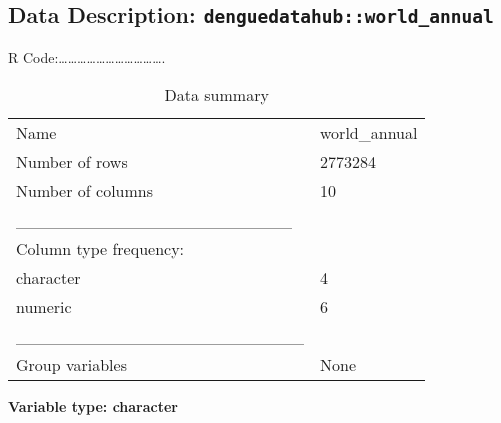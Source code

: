 \documentclass[
  letterpaper,
  DIV=11,
  numbers=noendperiod]{scrreprt}
\begin{document}
\subsection{\texorpdfstring{Data Description:
\texttt{denguedatahub::world\_annual}}{Data Description: denguedatahub::world\_annual}}\label{data-description-denguedatahubworld_annual}

R
Code:\ldots\ldots\ldots\ldots\ldots\ldots\ldots\ldots\ldots\ldots\ldots.

\begin{longtable}[]{@{}ll@{}}
\caption{Data summary}\tabularnewline
\toprule\noalign{}
\endfirsthead
\endhead
\bottomrule\noalign{}
\endlastfoot
Name & world\_annual \\
Number of rows & 2773284 \\
Number of columns & 10 \\
\_\_\_\_\_\_\_\_\_\_\_\_\_\_\_\_\_\_\_\_\_\_\_ & \\
Column type frequency: & \\
character & 4 \\
numeric & 6 \\
\_\_\_\_\_\_\_\_\_\_\_\_\_\_\_\_\_\_\_\_\_\_\_\_ & \\
Group variables & None \\
\end{longtable}

\textbf{Variable type: character}
\end{document}
